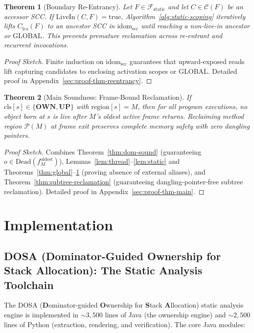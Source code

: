 \documentclass[12pt,a4paper]{article}
\newtheorem{theorem}{Theorem}[section]
\newcommand{\OWN}{\textbf{OWN}}
\newcommand{\UP}{\textbf{UP}}
\newcommand{\GLOBAL}{\text{GLOBAL}}
\newcommand{\idom}{\text{idom}}
\newcommand{\cls}{\text{cls}}
\newcommand{\region}{\text{region}}
\begin{document}
\begin{theorem}[Boundary Re-Entrancy]
\label{thm:reentrancy}
Let $F \in \mathcal{F}_{\text{static}}$ and let $C \in \mathcal{C}(F)$ be an accessor SCC. If $\text{LiveIn}(C, F) = \text{true}$, Algorithm~\ref{alg:static-scoping} iteratively lifts $C_{\text{lca}}(F)$ to an ancestor SCC in $\idom_{\text{scc}}$ until reaching a non-live-in ancestor or $\GLOBAL$. This prevents premature reclamation across re-entrant and recurrent invocations.
\end{theorem}
\begin{proof}[Proof Sketch]
Finite induction on $\idom_{\text{scc}}$ guarantees that upward-exposed reads lift capturing candidates to enclosing activation scopes or $\GLOBAL$. Detailed proof in Appendix~\ref{sec:proof-thm-reentrancy}.
\end{proof}

\begin{theorem}[Main Soundness: Frame-Bound Reclamation]
\label{thm:main}
If $\cls[s] \in \{\OWN, \UP\}$ with $\region[s] = M$, then for all program executions, no object born at $s$ is live after $M$'s oldest active frame returns. Reclaiming method region $\mathcal{P}(M)$ at frame exit preserves complete memory safety with zero dangling pointers.
\end{theorem}
\begin{proof}[Proof Sketch]
Combines Theorem~\ref{thm:dom-sound} (guaranteeing $o \in \text{Dead}(f_M^{\text{oldest}})$), Lemmas~\ref{lem:thread}--\ref{lem:static} and Theorems~\ref{thm:global}--\ref{thm:reentrancy} (proving absence of external aliases), and Theorem~\ref{thm:subtree-reclamation} (guaranteeing dangling-pointer-free subtree reclamation). Detailed proof in Appendix~\ref{sec:proof-thm-main}.
\end{proof}

\section{Implementation}
\label{sec:implementation}

\subsection{DOSA (Dominator-Guided Ownership for Stack Allocation): The Static Analysis Toolchain}

The DOSA (\textbf{D}ominator-guided \textbf{O}wnership for \textbf{S}tack \textbf{A}llocation) static analysis engine is implemented in ${\sim}3{,}500$ lines of Java (the ownership engine) and ${\sim}2{,}500$ lines of Python (extraction, rendering, and verification). The core Java modules:
\end{document}
